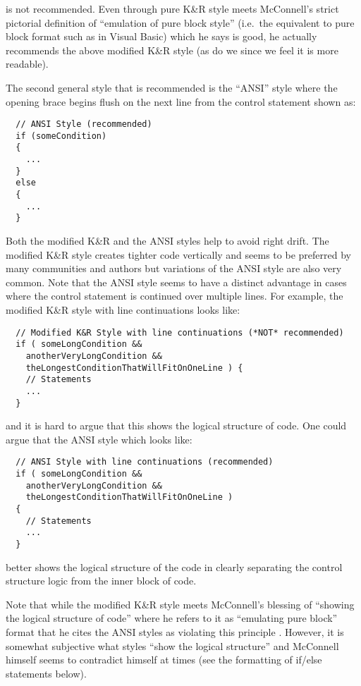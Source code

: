 \begin{itemize}
is not recommended.  Even through pure K\&R style meets McConnell's strict
pictorial definition of ``emulation of pure block style'' (i.e.\ the
equivalent to pure block format such as in Visual Basic) which he says is
good, he actually recommends the above modified K\&R style (as do we since we
feel it is more readable).

The second general style that is recommended is the ``ANSI'' style
\cite{ArtisticStyle} where the opening brace begins flush on the next
line from the control statement shown as:

{\small\begin{verbatim}
  // ANSI Style (recommended)
  if (someCondition)
  {
    ...
  }
  else
  {
    ...
  }
\end{verbatim}}

Both the modified K\&R and the ANSI styles help to avoid right drift.  The
modified K\&R style creates tighter code vertically and seems to be preferred
by many communities and authors but variations of the ANSI style are also very
common.  Note that the ANSI style seems to have a distinct advantage in cases
where the control statement is continued over multiple lines.  For example,
the modified K\&R style with line continuations looks like:

{\small\begin{verbatim}
  // Modified K&R Style with line continuations (*NOT* recommended)
  if ( someLongCondition &&
    anotherVeryLongCondition &&
    theLongestConditionThatWillFitOnOneLine ) {
    // Statements
    ...
  }
\end{verbatim}}

{}\noindent{}and it is hard to argue that this shows the logical structure of
code.  One could argue that the ANSI style which looks like:

{\small\begin{verbatim}
  // ANSI Style with line continuations (recommended)
  if ( someLongCondition &&
    anotherVeryLongCondition &&
    theLongestConditionThatWillFitOnOneLine )
  {
    // Statements
    ...
  }
\end{verbatim}}

better shows the logical structure of the code in clearly separating the
control structure logic from the inner block of code.

Note that while the modified K\&R style meets McConnell's blessing of
``showing the logical structure of code'' where he refers to it as
``emulating pure block'' format that he cites the ANSI styles as
violating this principle \cite[Section 31.1]{CodeComplete2nd04}.
However, it is somewhat subjective what styles ``show the logical
structure'' and McConnell himself seems to contradict himself at times
(see the formatting of if/else statements below).


\end{itemize}
